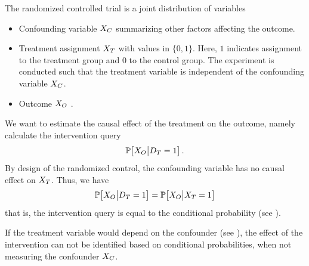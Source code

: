 \begin{example}
    The randomized controlled trial is a joint distribution of variables
    \begin{itemize}
        \item Confounding variable $X_{C}$ summarizing other factors affecting the outcome.
        \item Treatment assignment $X_{T}$ with values in $\{0,1\}$.
        Here, $1$ indicates assignment to the treatment group and $0$ to the control group.
        The experiment is conducted such that the treatment variable is independent of the confounding variable $X_{C}$.
        \item Outcome $X_{O}$ .
    \end{itemize}
    We want to estimate the causal effect of the treatment on the outcome, namely calculate the intervention query
    \begin{align*}
        \mathbb{P}\big[X_{O}\big|D_{T}=1\big] \, .
    \end{align*}
    By design of the randomized control, the confounding variable has no causal effect on $X_{T}$.
    Thus, we have
    \begin{align*}
        \mathbb{P}\big[X_{O}\big|D_{T}=1\big]
        = \mathbb{P}\big[X_{O}\big|X_{T}=1\big]
    \end{align*}
    that is, the intervention query is equal to the conditional probability (see ).


    If the treatment variable would depend on the confounder (see ), the effect of the intervention can not be identified based on conditional probabilities, when not measuring the confounder $X_{C}$.

    
    
    \begin{figure}[hbt!]
\end{figure}
\end{example}
